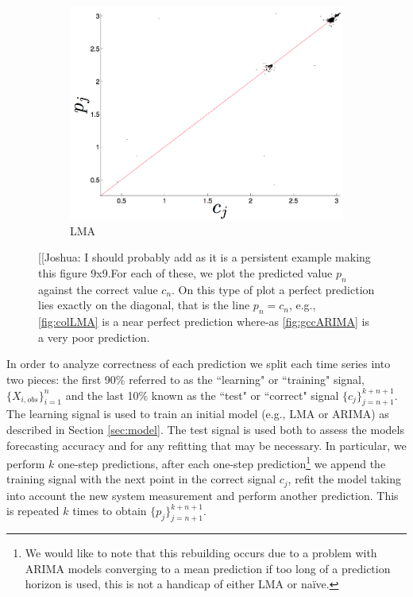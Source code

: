 \begin{figure}[htbp]
\begin{subfigure}{0.32\columnwidth}
    \includegraphics[width=\columnwidth]{figs/svdfiveLMAForecast.png}
    \caption{\svdfive LMA}
    \label{fig:gccLMA}
  \end{subfigure}
   \caption{
{\color{red}[[Joshua: I should probably add \svdfive as it is a persistent example making this figure 9x9.}For each of these, we plot the predicted value $p_n$ against the correct value $c_n$. On this type of plot a perfect prediction lies exactly on the diagonal, that is the line $p_n = c_n$, e.g., \ref{fig:colLMA} is a near perfect prediction where-as \ref{fig:gccARIMA} is a very poor prediction. }\label{fig:gcc_vs_col}  
\end{figure} 
In order to analyze correctness of each prediction we split each time series into two pieces: the first 90\% referred to as the ``learning" or ``training" signal, $\{X_{i,obs}\}_{i=1}^{n}$ and the last 10\% known as the ``test" or ``correct" signal $\{c_j\}_{j=n+1}^{k+n+1}$. The learning signal is used to train an initial model (e.g., LMA or ARIMA) as described in Section \ref{sec:model}. The test signal is used both to assess the models forecasting accuracy and for any refitting that may be necessary. In particular, we perform $k$ one-step predictions, after each one-step prediction\footnote{We would like to note that this rebuilding occurs due to a problem with ARIMA models converging to a mean prediction if too long of a prediction horizon is used, this is not a handicap of either LMA or na\"ive.} we append the training signal with the next point in the correct signal $c_j$, refit the model taking into account the new system measurement and perform another prediction. This is repeated $k$ times to obtain $\{p_j\}_{j=n+1}^{k+n+1}$.

